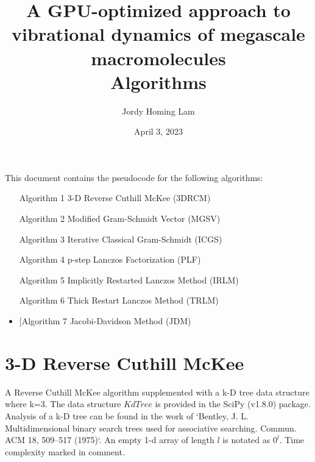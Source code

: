 \documentclass[a4paper]{article}
\title{A GPU-optimized approach to vibrational dynamics of megascale macromolecules \protect\\ Algorithms \protect\\}
\author{Jordy Homing Lam}
\date{April 3, 2023}
\begin{document}
\maketitle

This document contains the pseudocode for the following algorithms:
\begin{itemize}
\item [Algorithm 1] 3-D Reverse Cuthill McKee (3DRCM)
\item [Algorithm 2] Modified Gram-Schmidt Vector (MGSV)
\item [Algorithm 3] Iterative Classical Gram-Schmidt (ICGS)
\item [Algorithm 4] p-step Lanczos Factorization (PLF)
\item [Algorithm 5] Implicitly Restarted Lanczos Method (IRLM)
\item [Algorithm 6] Thick Restart Lanczos Method (TRLM)
\item [Algorithm 7 Jacobi-Davidson Method (JDM)
\end{itemize}











\pagebreak







\section{3-D Reverse Cuthill McKee}

A Reverse Cuthill McKee algorithm supplemented with a k-D tree data structure where k=3. The data structure $KdTree$ is provided in the SciPy (v1.8.0) package. Analysis of a k-D tree can be found in the work of `Bentley, J. L. Multidimensional binary search trees used for associative searching. Commun. ACM 18, 509–517 (1975)`. An empty 1-d array of length $l$ is notated as $0^l$. Time complexity marked in comment.
\end{document}

